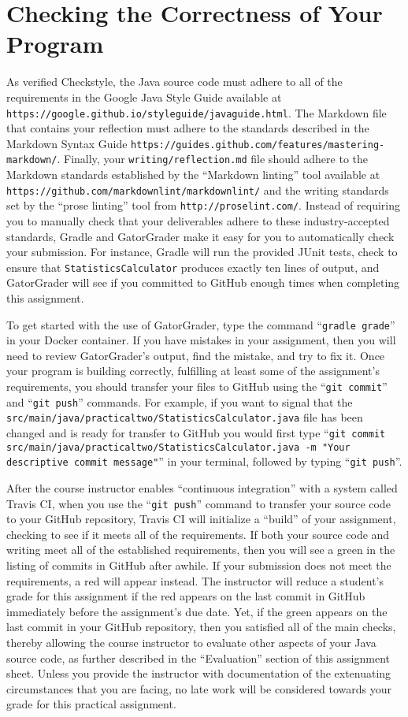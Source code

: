 \documentclass[11pt]{article}
\newcommand{\mainprogram}{\lstinline{StatisticsCalculator}}
\newcommand{\mainprogramsource}{\lstinline{src/main/java/practicaltwo/StatisticsCalculator.java}}
\newcommand{\reflection}{\lstinline{writing/reflection.md}}
\newcommand{\gatorgraderstart}{\command{gradle grade}}
\newcommand{\gitcommit}{\command{git commit}}
\newcommand{\gitpush}{\command{git push}}
\newcommand{\gitcommitmainprogram}{\command{git commit src/main/java/practicaltwo/StatisticsCalculator.java -m "Your
descriptive commit message"}}
\newcommand{\command}[1]{``\lstinline{#1}''}
\newcommand{\url}[1]{\lstinline{#1}}
\newcommand{\step}[1]{``{#1}''}
\newcommand{\checkmark}{\ding{51}}
\newcommand{\naughtmark}{\ding{55}}
\begin{document}
\section*{Checking the Correctness of Your Program}

As verified Checkstyle, the Java source code must adhere to all of the
requirements in the Google Java Style Guide available at
\url{https://google.github.io/styleguide/javaguide.html}. The Markdown file that
contains your reflection must adhere to the standards described in the Markdown
Syntax Guide \url{https://guides.github.com/features/mastering-markdown/}.
Finally, your \reflection{} file should adhere to the Markdown standards
established by the \step{Markdown linting} tool available at
\url{https://github.com/markdownlint/markdownlint/} and the writing standards
set by the \step{prose linting} tool from \url{http://proselint.com/}. Instead
of requiring you to manually check that your deliverables adhere to these
industry-accepted standards, Gradle and GatorGrader make it easy for you to
automatically check your submission. For instance, Gradle will run the provided
JUnit tests, check to ensure that \mainprogram{} produces exactly ten lines of
output, and GatorGrader will see if you committed to GitHub enough times when
completing this assignment.

To get started with the use of GatorGrader, type the command \gatorgraderstart{}
in your Docker container. If you have mistakes in your assignment, then you will
need to review GatorGrader's output, find the mistake, and try to fix it. Once
your program is building correctly, fulfilling at least some of the assignment's
requirements, you should transfer your files to GitHub using the \gitcommit{}
and \gitpush{} commands. For example, if you want to signal that the
\mainprogramsource{} file has been changed and is ready for transfer to GitHub
you would first type \gitcommitmainprogram{} in your terminal, followed by
typing \gitpush{}.

After the course instructor enables \step{continuous integration} with a system
called Travis CI, when you use the \gitpush{} command to transfer your source
code to your GitHub repository, Travis CI will initialize a \step{build} of your
assignment, checking to see if it meets all of the requirements. If both your
source code and writing meet all of the established requirements, then you will
see a green \checkmark{} in the listing of commits in GitHub after awhile. If
your submission does not meet the requirements, a red \naughtmark{} will appear
instead. The instructor will reduce a student's grade for this assignment if the
red \naughtmark{} appears on the last commit in GitHub immediately before the
assignment's due date. Yet, if the green \checkmark{} appears on the last commit
in your GitHub repository, then you satisfied all of the main checks, thereby
allowing the course instructor to evaluate other aspects of your Java source
code, as further described in the \step{Evaluation} section of this assignment
sheet. Unless you provide the instructor with documentation of the extenuating
circumstances that you are facing, no late work will be considered towards your
grade for this practical assignment.
\end{document}
